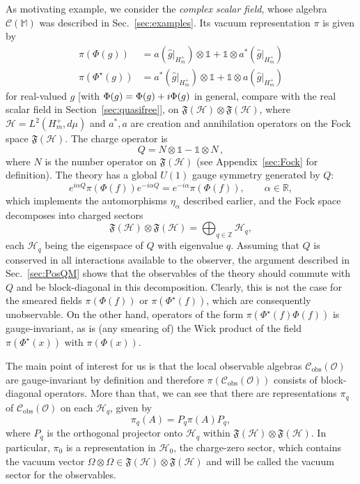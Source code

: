 \documentclass[12pt,a4paper]{article}
\let\Re\relax
\let\Im\relax
\DeclareMathOperator{\Re}{Re}
\DeclareMathOperator{\Im}{Im}
\newcommand{\1}{\mathds{1}}                         %
\newcommand{\ZZ}{\mathbb{Z}} %
\newcommand{\RR}{\mathbb{R}}           %
\newcommand{\Hcal}{\mathcal {H}}
\newcommand{\Ocal}{\mathcal{O}}
\newcommand{\fF}{\mathfrak{F}}
\newcommand{\MM}{\mathbb{M}}
\newcommand{\FF}{{\mathfrak{F}}}
\newcommand{\HH}{{\mathcal{H}}}
\newcommand{\II}{{\mathbb{1}}}
\newcommand{\Cc}{{\mathcal{C}}}
\begin{document}
As motivating example, we consider the \emph{complex scalar field}, whose algebra
$\Cc(\MM)$ was described in Sec.~\ref{sec:examples}. Its vacuum representation $\pi$ is given by
\begin{align*}
\pi(\Phi(g)) &= a(\hat{g}|_{H_m^+})\otimes \II + \II\otimes a^*(\hat{g}|_{H_m^+})\\
\pi(\Phi^\star(g)) &= a^*(\hat{g}|_{H_m^+}) \otimes \II + \II\otimes a(\hat{g}|_{H_m^+})
\end{align*}
for real-valued $g$ [with $\Phi(g)=\Phi(\Re g) + i \Phi(\Im g)$ in general, compare with the real scalar field in Section~\ref{sec:quasifree}], on $\FF(\Hcal)\otimes \FF(\Hcal)$, where $\Hcal=L^2(H^+_{m},d\mu)$ and $a^*,a$ are creation and annihilation operators on the Fock space  $\FF(\Hcal)$. The charge operator is 
\[
Q = N\otimes \II - \II \otimes N\,,
\]
where $N$ is the number operator on $\FF(\Hcal)$ (see Appendix~\ref{sec:Fock} for definition). The theory has a global $U(1)$ gauge symmetry generated by $Q$:
\begin{equation}
\label{eq:QPhi} 
e^{i\alpha Q}\pi(\Phi(f)) e^{-i\alpha Q} = e^{-i\alpha} \pi(\Phi(f)),\qquad \alpha\in\RR,
\end{equation} 
which implements the automorphisms $\eta_\alpha$ described earlier, 
and the Fock space decomposes into charged sectors
\[
\FF(\Hcal)\otimes \fF(\Hcal) = \bigoplus_{q\in\ZZ} \HH_q,
\]
each $\HH_q$ being the eigenspace of $Q$ with eigenvalue $q$. Assuming that $Q$ is conserved in all interactions available to the observer, the argument
described in Sec.~\ref{sec:PosQM} shows that the observables of the theory should commute with $Q$ and be block-diagonal in this decomposition. Clearly, this is not the case for the smeared fields $\pi(\Phi(f))$ or $\pi(\Phi^\star(f))$, which are consequently unobservable. On the other hand, operators of the form $\pi(\Phi^\star(f)\Phi(f))$ is gauge-invariant, as is (any smearing of) the Wick product of the field $\pi(\Phi^\star(x))$ with $\pi(\Phi(x))$. 

The main point of interest for us is that the local observable algebras $\Cc_{\text{obs}}(\Ocal)$ are gauge-invariant by definition and therefore $\pi(\Cc_{\text{obs}}(\Ocal))$ consists of block-diagonal operators. More than that, we can see that there are representations $\pi_q$ of $\Cc_{\text{obs}}(\Ocal)$ on each $\HH_q$, given by 
	\[
	\pi_q(A) = P_q \pi(A) P_q,
	\]
	where $P_q$ is the orthogonal projector onto $\HH_q$ within $\FF(\Hcal)\otimes \FF(\Hcal)$. In particular, $\pi_0$ is a representation in $\HH_0$, the charge-zero sector, which  contains the vacuum vector $\Omega\otimes\Omega\in\FF(\Hcal)\otimes\FF(\Hcal)$ and will be called the vacuum sector for the observables.
\end{document}
